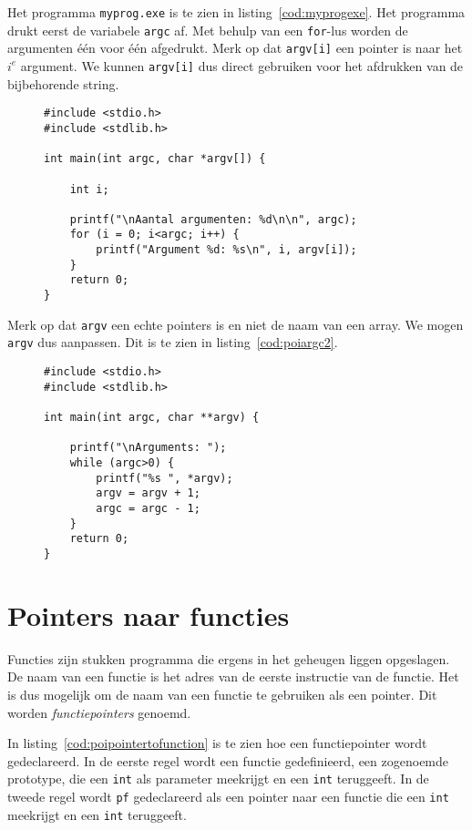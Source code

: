 Het programma \texttt{myprog.exe} is te zien in listing~\ref{cod:myprogexe}. Het
programma drukt eerst de variabele \texttt{argc} af. Met behulp van een \texttt{for}-lus
worden de argumenten \'e\'en voor \'e\'en afgedrukt. Merk op dat \texttt{argv[i]} een
pointer is naar het $i^e$ argument. We kunnen \texttt{argv[i]} dus direct gebruiken
voor het afdrukken van de bijbehorende string.

\begin{figure}[!ht]
\begin{lstlisting}[caption=Het programma myprog.exe.,label=cod:myprogexe]
#include <stdio.h>
#include <stdlib.h>

int main(int argc, char *argv[]) {

    int i;

    printf("\nAantal argumenten: %d\n\n", argc);
    for (i = 0; i<argc; i++) {
        printf("Argument %d: %s\n", i, argv[i]);
    }
    return 0;
}
\end{lstlisting}
\end{figure}

Merk op dat \texttt{argv} een echte pointers is en niet de naam van een array. We mogen \texttt{argv} dus aanpassen. Dit is te zien in listing~\ref{cod:poiargc2}.

\begin{figure}[!ht]
\begin{lstlisting}[caption=Afdrukken van argumenten.,label=cod:poiargc2]
#include <stdio.h>
#include <stdlib.h>

int main(int argc, char **argv) {

    printf("\nArguments: ");
    while (argc>0) {
        printf("%s ", *argv);
        argv = argv + 1;
        argc = argc - 1;
    }
    return 0;
}
\end{lstlisting}
\end{figure}

\section{Pointers naar functies}
\label{sec:pointersnaarfunctie}
Functies zijn stukken programma die ergens in het geheugen liggen opgeslagen. De naam van een functie is het adres van de eerste instructie van de functie. Het is dus mogelijk om de naam van een functie te gebruiken als een pointer. Dit worden \textsl{functiepointers} genoemd.

In listing~\ref{cod:poipointertofunction} is te zien hoe een functiepointer wordt gedeclareerd. In de eerste regel wordt een functie gedefinieerd, een zogenoemde prototype, die een \texttt{int} als parameter meekrijgt en een \texttt{int} teruggeeft. In de tweede regel wordt \texttt{pf} gedeclareerd als een pointer naar een functie die een \texttt{int} meekrijgt en een \texttt{int} teruggeeft.

